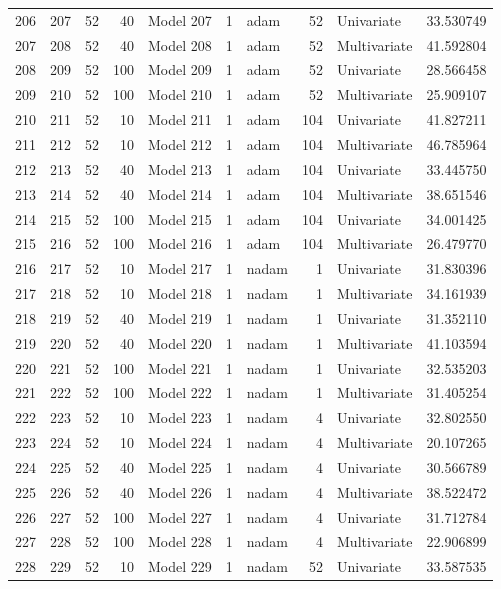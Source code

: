 \begin{tabular}{lrrrlrlrlr}
206 & 207 & 52 & 40 & Model 207 & 1 & adam & 52 & Univariate & 33.530749 \\
207 & 208 & 52 & 40 & Model 208 & 1 & adam & 52 & Multivariate & 41.592804 \\
208 & 209 & 52 & 100 & Model 209 & 1 & adam & 52 & Univariate & 28.566458 \\
209 & 210 & 52 & 100 & Model 210 & 1 & adam & 52 & Multivariate & 25.909107 \\
210 & 211 & 52 & 10 & Model 211 & 1 & adam & 104 & Univariate & 41.827211 \\
211 & 212 & 52 & 10 & Model 212 & 1 & adam & 104 & Multivariate & 46.785964 \\
212 & 213 & 52 & 40 & Model 213 & 1 & adam & 104 & Univariate & 33.445750 \\
213 & 214 & 52 & 40 & Model 214 & 1 & adam & 104 & Multivariate & 38.651546 \\
214 & 215 & 52 & 100 & Model 215 & 1 & adam & 104 & Univariate & 34.001425 \\
215 & 216 & 52 & 100 & Model 216 & 1 & adam & 104 & Multivariate & 26.479770 \\
216 & 217 & 52 & 10 & Model 217 & 1 & nadam & 1 & Univariate & 31.830396 \\
217 & 218 & 52 & 10 & Model 218 & 1 & nadam & 1 & Multivariate & 34.161939 \\
218 & 219 & 52 & 40 & Model 219 & 1 & nadam & 1 & Univariate & 31.352110 \\
219 & 220 & 52 & 40 & Model 220 & 1 & nadam & 1 & Multivariate & 41.103594 \\
220 & 221 & 52 & 100 & Model 221 & 1 & nadam & 1 & Univariate & 32.535203 \\
221 & 222 & 52 & 100 & Model 222 & 1 & nadam & 1 & Multivariate & 31.405254 \\
222 & 223 & 52 & 10 & Model 223 & 1 & nadam & 4 & Univariate & 32.802550 \\
223 & 224 & 52 & 10 & Model 224 & 1 & nadam & 4 & Multivariate & 20.107265 \\
224 & 225 & 52 & 40 & Model 225 & 1 & nadam & 4 & Univariate & 30.566789 \\
225 & 226 & 52 & 40 & Model 226 & 1 & nadam & 4 & Multivariate & 38.522472 \\
226 & 227 & 52 & 100 & Model 227 & 1 & nadam & 4 & Univariate & 31.712784 \\
227 & 228 & 52 & 100 & Model 228 & 1 & nadam & 4 & Multivariate & 22.906899 \\
228 & 229 & 52 & 10 & Model 229 & 1 & nadam & 52 & Univariate & 33.587535 \\

\end{tabular}
